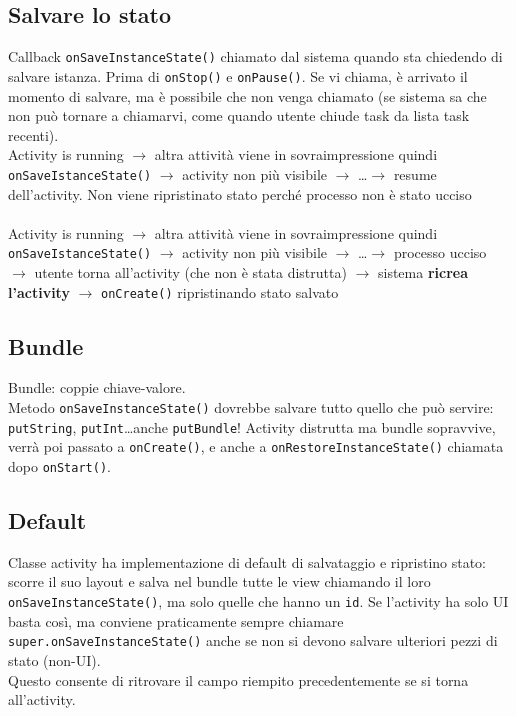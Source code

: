 \documentclass[10pt]{book}
\begin{document}
\subsection{Salvare lo stato}
Callback \texttt{onSaveInstanceState()} chiamato dal sistema quando sta chiedendo di salvare istanza. Prima di \texttt{onStop()} e \texttt{onPause()}. Se vi chiama, è arrivato il momento di salvare, ma è possibile che non venga chiamato (se sistema sa che non può tornare a chiamarvi, come quando utente chiude task da lista task recenti).\\
Activity is running $\rightarrow$ altra attività viene in sovraimpressione quindi \texttt{onSaveIstanceState()} $\rightarrow$ activity non più visibile $\rightarrow$ \ldots $\rightarrow$ resume dell'activity. Non viene ripristinato stato perché processo non è stato ucciso\\\\
Activity is running $\rightarrow$ altra attività viene in sovraimpressione quindi \texttt{onSaveIstanceState()} $\rightarrow$ activity non più visibile $\rightarrow$ \ldots $\rightarrow$ processo ucciso $\rightarrow$ utente torna all'activity (che non è stata distrutta) $\rightarrow$ sistema \textbf{ricrea l'activity} $\rightarrow$ \texttt{onCreate()} ripristinando stato salvato
\subsection{Bundle}
Bundle: coppie chiave-valore.\\
Metodo \texttt{onSaveInstanceState()} dovrebbe salvare tutto quello che può servire: \texttt{putString}, \texttt{putInt}\ldots anche \texttt{putBundle}! Activity distrutta ma bundle sopravvive, verrà poi passato a \texttt{onCreate()}, e anche a \texttt{onRestoreInstanceState()} chiamata dopo \texttt{onStart()}.\\
\subsection{Default}
Classe activity ha implementazione di default di salvataggio e ripristino stato: scorre il suo layout e salva nel bundle tutte le view chiamando il loro \texttt{onSaveInstanceState()}, ma solo quelle che hanno un \texttt{id}. Se l'activity ha solo UI basta così, ma conviene praticamente sempre chiamare \texttt{super.onSaveInstanceState()} anche se non si devono salvare ulteriori pezzi di stato (non-UI).\\
Questo consente di ritrovare il campo riempito precedentemente se si torna all'activity.
\end{document}
